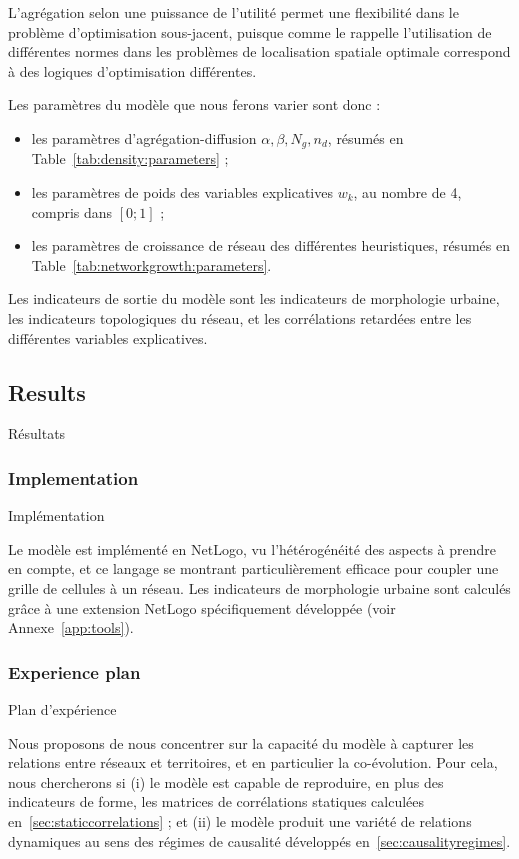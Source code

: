 L'agrégation selon une puissance de l'utilité permet une flexibilité dans le problème d'optimisation sous-jacent, puisque comme le rappelle \cite{josselin2013revisiting} l'utilisation de différentes normes dans les problèmes de localisation spatiale optimale correspond à des logiques d'optimisation différentes.


Les paramètres du modèle que nous ferons varier sont donc :
\begin{itemize}
	\item les paramètres d'agrégation-diffusion $\alpha,\beta,N_g,n_d$, résumés en Table~\ref{tab:density:parameters} ;
	\item les paramètres de poids des variables explicatives $w_k$, au nombre de 4, compris dans $[0;1]$ ;
	\item les paramètres de croissance de réseau des différentes heuristiques, résumés en Table~\ref{tab:networkgrowth:parameters}.
\end{itemize}

Les indicateurs de sortie du modèle sont les indicateurs de morphologie urbaine, les indicateurs topologiques du réseau, et les corrélations retardées entre les différentes variables explicatives.


\subsection{Results}{Résultats}

\subsubsection{Implementation}{Implémentation}

Le modèle est implémenté en NetLogo, vu l'hétérogénéité des aspects à prendre en compte, et ce langage se montrant particulièrement efficace pour coupler une grille de cellules à un réseau. Les indicateurs de morphologie urbaine sont calculés grâce à une extension NetLogo spécifiquement développée (voir Annexe~\ref{app:tools}).


\subsubsection{Experience plan}{Plan d'expérience}

Nous proposons de nous concentrer sur la capacité du modèle à capturer les relations entre réseaux et territoires, et en particulier la co-évolution. Pour cela, nous chercherons si (i) le modèle est capable de reproduire, en plus des indicateurs de forme, les matrices de corrélations statiques calculées en~\ref{sec:staticcorrelations} ; et (ii) le modèle produit une variété de relations dynamiques au sens des régimes de causalité développés en~\ref{sec:causalityregimes}.

